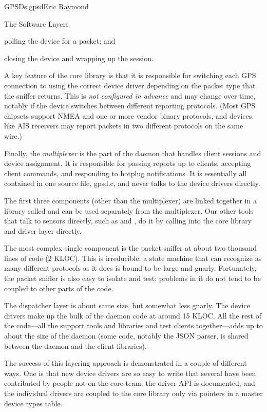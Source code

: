 \begin{aosachapter}{GPSD}{s:gpsd}{Eric Raymond}
\begin{aosasect1}{The Software Layers}
\begin{aosaitemize}
  \item polling the device for a packet; and

  \item closing the device and wrapping up the session.

\end{aosaitemize}

A key feature of the core library is that it is responsible for
switching each GPS connection to using the correct device driver
depending on the packet type that the sniffer returns.  This is
\emph{not configured in advance} and may change over time, notably if
the device switches between different reporting protocols.  (Most GPS
chipsets support NMEA and one or more vendor binary protocols, and
devices like AIS receivers may report packets in two different
protocols on the same wire.)

Finally, the \emph{multiplexer} is the part of the daemon that handles
client sessions and device assignment.  It is responsible for passing
reports up to clients, accepting client commands, and responding to
hotplug notifications. It is essentially all contained in one source
file, gpsd.c, and never talks to the device drivers directly.

The first three components (other than the multiplexer) are linked
together in a library called  and can be used separately
from the multiplexer. Our other tools that talk to sensors directly,
such as  and , do it by calling into the
core library and driver layer directly.

The most complex single component is the packet sniffer at about two
thousand lines of code (2 KLOC).  This is irreducible; a state machine
that can recognize as many different protocols as it does is bound to
be large and gnarly.  Fortunately, the packet sniffer is also easy to
isolate and test; problems in it do not tend to be coupled to other
parts of the code.

The dispatcher layer is about same size, but somewhat less gnarly.
The device drivers make up the bulk of the daemon code at around 15
KLOC.  All the rest of the code---all the support tools and libraries
and test clients together---adds up to about the size of the daemon
(some code, notably the JSON parser, is shared between the daemon and
the client libraries).

The success of this layering approach is demonstrated in a couple of
different ways.  One is that new device drivers are so easy to write
that several have been contributed by people not on the core team: the
driver API is documented, and the individual drivers are coupled to
the core library only via pointers in a master device types table.


\end{aosasect1}
\end{aosachapter}
